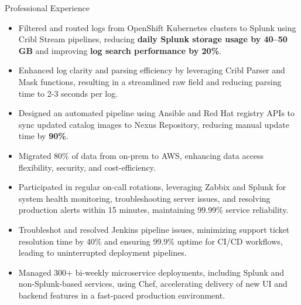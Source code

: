 \documentclass{resume}
\begin{document}
\begin{experienceSection}{Professional Experience}
    \experienceItem[
        company={Arch Mortgage Insurance},
        location={Greensboro, NC},
        position={IT-Infrastructure-Platform/SRE Intern},
        duration={Jun 2024 - Aug 2024}
    ]
    \begin{itemize}
        \itemsep -6pt {}
        \item Filtered and routed logs from OpenShift Kubernetes clusters to Splunk using Cribl Stream pipelines, reducing \textbf{daily Splunk storage usage by 40–50 GB} and improving \textbf{log search performance by 20\%}.
        \item Enhanced log clarity and parsing efficiency by leveraging Cribl Parser and Mask functions, resulting in a streamlined raw field and reducing parsing time to 2-3 seconds per log.
        \item Designed an automated pipeline using Ansible and Red Hat registry APIs to sync updated catalog images to Nexus Repository, reducing manual update time by\textbf{ 90\%}.
        
    \end{itemize}

    \experienceItem[
        company={Cerner Healthcare},
        location={Bangalore, India},
        position={System Engineer - 1},
        duration={May 2021 - Jul 2023}
    ]
    \begin{itemize}
        \itemsep -6pt {}
        \item Migrated 80\% of data from on-prem to AWS, enhancing data access flexibility, security, and cost-efficiency.
        \item Participated in regular on-call rotations, leveraging Zabbix and Splunk for system health monitoring, troubleshooting server issues, and resolving production alerts within 15 minutes, maintaining 99.99\% service reliability.
        \item Troubleshot and resolved Jenkins pipeline issues, minimizing support ticket resolution time by 40\% and ensuring 99.9\% uptime for CI/CD workflows, leading to uninterrupted deployment pipelines.
        \item Managed 300+ bi-weekly microservice deployments, including Splunk and non-Splunk-based services, using Chef, accelerating delivery of new UI and backend features in a fast-paced production environment.
    \end{itemize}

\end{experienceSection}
\end{document}
